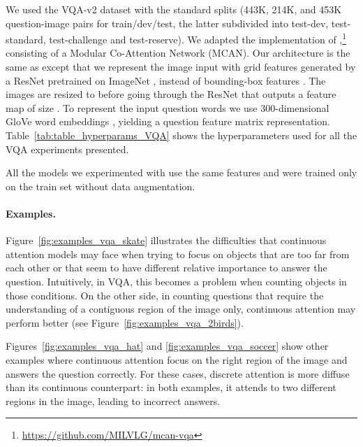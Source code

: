 \documentclass{article}
\begin{document}
We used the VQA-v2 dataset \cite{Goyal2019} with the standard splits (443K, 214K, and 453K question-image pairs for train/dev/test, the latter subdivided into  test-dev, test-standard, test-challenge and test-reserve). We adapted the implementation of \cite{Yu2019},\footnote{\url{https://github.com/MILVLG/mcan-vqa}} consisting of a Modular Co-Attention Network (MCAN). Our architecture is the same as \cite{Yu2019} except that we represent the image input with grid features generated by a ResNet \cite{He2016} pretrained on ImageNet \cite{Russakovsky2015}, instead of bounding-box features \cite{Anderson2018}. 
The images are resized to  before going through the ResNet that outputs a feature map of size . To represent the input question words we use 300-dimensional GloVe word embeddings \cite{pennington2014glove}, yielding a question feature matrix representation. Table~\ref{tab:table_hyperparams_VQA} shows the hyperparameters used for all the VQA experiments presented.

All the models we experimented with use the same features and were trained only on the train set without data augmentation.

\paragraph{Examples.} 
Figure~\ref{fig:examples_vqa_skate} illustrates the difficulties that continuous attention models may face when trying to focus on objects that are too far from each other or that seem to have different relative importance to answer the question. Intuitively, in VQA, this becomes a problem when counting objects in those conditions. On the other side, in counting questions that require the understanding of a contiguous region of the image only, continuous attention may perform better (see Figure~\ref{fig:examples_vqa_2birds}).

Figures~\ref{fig:examples_vqa_hat} and \ref{fig:examples_vqa_soccer} show other examples where continuous attention focus on the right region of the image and answers the question correctly. For these cases, discrete attention is more diffuse than its continuous counterpart: in both examples, it attends to two different regions in the image, leading to incorrect answers.

\begin{comment}
For the continuous attention models, the image size is normalized into the unit square  with each coordinate  positioned at  for , creating a meshgrid. We fit a bivariate Gaussian () or a bivariate truncated paraboloid () as the attention density; both correspond  to a score function , where   and  and  are location and scale parameters. We first use the discrete attention weights to compute  and use moment matching to compute  and , yielding a density  (continuous softmax) or 
 (continuous sparsemax), 
and a context vector , where  are  Gaussian RBFs 
, with  linearly spaced in a square grid  and , where  is the  identity matrix. Again, this does not increase the number of neural network parameters, compared to discrete attention. 
\end{comment}
\end{document}
